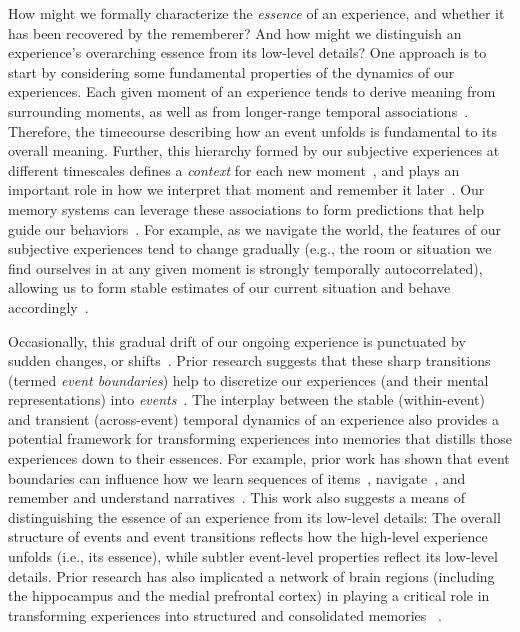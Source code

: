 \documentclass[10pt]{article}
\begin{document}
How might we formally characterize the \textit{essence} of an experience, and whether it has been recovered by the rememberer?  And how might we distinguish an experience's overarching essence from its low-level details?  One approach is to start by considering some fundamental properties of the dynamics of our experiences.  Each given moment of an experience tends to derive meaning from surrounding moments, as well as from longer-range temporal associations~\citep{LernEtal11, Mann19, Mann20}.  Therefore, the timecourse describing how an event unfolds is fundamental to its overall meaning.  Further, this hierarchy formed by our subjective experiences at different timescales defines a \textit{context} for each new moment~\citep[e.g.,][]{HowaKaha02a, HowaEtal14}, and plays an important role in how we interpret that moment and remember it later~\citep[for review see][]{MannEtal15, Mann20}.  Our memory systems can leverage these associations to form predictions that help guide our behaviors~\citep{RangRitc12}.  For example, as we navigate the world, the features of our subjective experiences tend to change gradually (e.g., the room or situation we find ourselves in at any given moment is strongly temporally autocorrelated), allowing us to form stable estimates of our current situation and behave accordingly~\citep{ZackEtal07, ZwaaRadv98}.

Occasionally, this gradual drift of our ongoing experience is punctuated by sudden changes, or shifts~\citep[e.g., when we walk through a doorway;][]{RadvZack17}.  Prior research suggests that these sharp transitions (termed \textit{event boundaries}) help to discretize our experiences (and their mental representations) into \textit{events}~\citep{RadvZack17, BrunEtal18, HeusEtal18b, ClewDava17, EzzyDava11, DuBrDava13}.  The interplay between the stable (within-event) and transient (across-event) temporal dynamics of an experience also provides a potential framework for transforming experiences into memories that distills those experiences down to their essences.  For example, prior work has shown that event boundaries can influence how we learn sequences of items~\citep{HeusEtal18b, DuBrDava13}, navigate~\citep{BrunEtal18}, and remember and understand narratives~\citep{ZwaaRadv98, EzzyDava11}.  This work also suggests a means of distinguishing the essence of an experience from its low-level details:  The overall structure of events and event transitions reflects how the high-level experience unfolds (i.e., its essence), while subtler event-level properties reflect its low-level details.  Prior research has also implicated a network of brain regions (including the hippocampus and the medial prefrontal cortex) in playing a critical role in transforming experiences into structured and consolidated memories ~\citep{TompDava17}.
\end{document}
